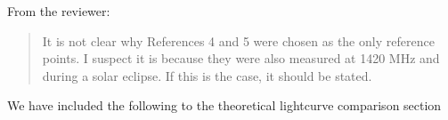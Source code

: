 \documentclass{article}
\begin{document}
From the reviewer:

\begin{quote}
  It is not clear why References 4 and 5 were chosen as the only reference points.
  I suspect it is because they were also measured at 1420 MHz and during a solar eclipse. If this is the case, it should be stated.
\end{quote}

\noindent We have included the following to the theoretical lightcurve comparison section

\begin{quote}
  
\end{quote}
  




\end{document}

